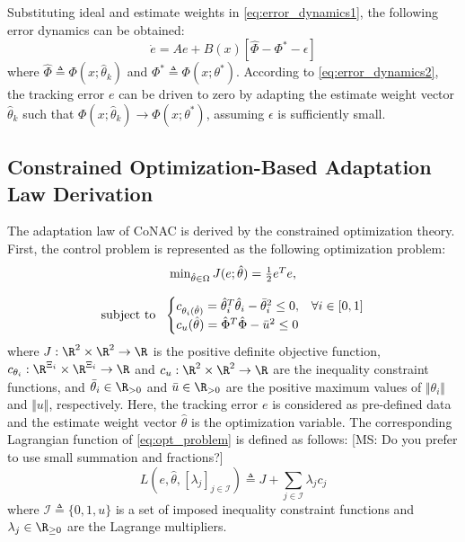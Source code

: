 \documentclass[conference]{IEEEtran}
\newcommand{\MSRY}[1]{{\color{red} [MS: #1]}} %
\begin{document}
Substituting ideal and estimate weights in \eqref{eq:error_dynamics1}, the following error dynamics can be obtained:
\begin{equation}
	\dot e = Ae + B(x) 
	[
		\hat\Phi - \Phi^* -\epsilon	
	] 
	\label{eq:error_dynamics2}
\end{equation}
where $\hat\Phi\triangleq \Phi(x;\hat\theta_k)$ and $\Phi^*\triangleq \Phi(x;\theta^*)$.
According to \eqref{eq:error_dynamics2}, the tracking error $e$ can be driven to zero by adapting the estimate weight vector $\hat\theta_k$ such that $\Phi(x;\hat\theta_k) \to \Phi(x;\theta^*)$, assuming $\epsilon$ is sufficiently small.

\subsection{Constrained Optimization-Based Adaptation Law Derivation}

The adaptation law of CoNAC is derived by the constrained optimization theory.
First, the control problem is represented as the following optimization problem:
\begin{equation}
	\begin{matrix}
		\min_{\hat\theta\in\Omega}
		J(e;\hat\theta)={1\over2} e^Te 
		,\\ \\
		\text{subject to }\ 
		\begin{cases}
			c_{\theta_i(\hat\theta)}= 
			\hat\theta_i^T\hat\theta_i-\bar\theta_i^2 \le 0,
			&\forall i\in[0,1]
			\\
			c_u(\hat\theta) 
			=\hat\Phi^T\hat\Phi  - \bar u^2  \le 0
		\end{cases}
	\end{matrix}
		\label{eq:opt_problem}
\end{equation}
where $J:\R^2\times\R^2\to\R$ is the positive definite objective function, $c_{\theta_i}:\R^{\Xi_i}\times\R^{\Xi_i}\to \R$ and $c_u:\R^2\times\R^2\to\R$ are the inequality constraint functions, and $\bar\theta_i\in\R_{>0}$ and $\bar u\in\R_{>0}$ are the positive maximum values of $\Vert\theta_i\Vert$ and $\Vert u\Vert$, respectively.
Here, the tracking error $e$ is considered as pre-defined data and the estimate weight vector $\hat\theta$ is the optimization variable.
The corresponding Lagrangian function of \eqref{eq:opt_problem} is defined as follows:
\MSRY{Do you prefer to use small summation and fractions?}
\begin{equation}
	L(e,\hat\theta,[\lambda_j]_{j\in\mathcal I}) 
	\triangleq
	J + \sum_{j\in\mathcal I} \lambda_j c_j
	\label{eq:lagrangian}
\end{equation}
where $\mathcal I\triangleq\{0,1,u\}$ is a set of imposed inequality constraint functions and $\lambda_j\in\R_{\ge0}$ are the Lagrange multipliers.
\end{document}
